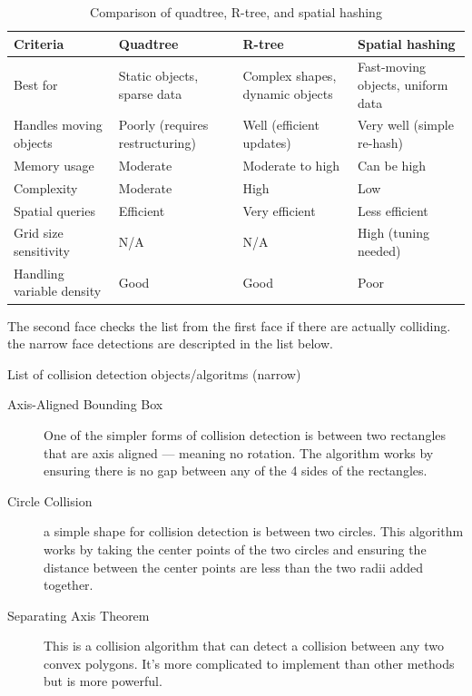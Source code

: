 \documentclass{projdoc}
\begin{document}
\begin{table}
	\begin{tabularx}{\linewidth}{p{8em}XXX}
		\toprule
		Criteria & Quadtree & R-tree & Spatial hashing \\
		\midrule
		Best for & Static objects, sparse data & Complex shapes, dynamic objects & Fast-moving objects, uniform data \\
		\midrule
		Handles moving objects & Poorly (requires restructuring) & Well (efficient updates) & Very well (simple re-hash) \\
		\midrule
		Memory usage & Moderate & Moderate to high & Can be high \\
		\midrule
		Complexity & Moderate & High & Low \\
		\midrule
		Spatial queries & Efficient & Very efficient & Less efficient \\
		\midrule
		Grid size sensitivity & N/A & N/A & High (tuning needed) \\
		\midrule
		Handling variable density & Good & Good & Poor \\
		\bottomrule
	\end{tabularx}
	\caption{Comparison of quadtree, R-tree, and spatial hashing}
\end{table}


The second face checks the list from the first face if there are actually colliding. the narrow face detections are descripted in the list below.

List of collision detection objects/algoritms (narrow)
\begin{description}
	\item[Axis-Aligned Bounding Box]One of the simpler forms of collision detection is
		between two rectangles that are axis aligned --- meaning no rotation. The
		algorithm works by ensuring there is no gap between any of the 4 sides of the
		rectangles.
	\item[Circle Collision] a simple shape for collision detection is between two
		circles. This algorithm works by taking the center points of the two circles and
		ensuring the distance between the center points are less than the two radii added
		together.
	\item[Separating Axis Theorem] This is a collision algorithm that can detect a
		collision between any two convex polygons. It's more complicated to implement
		than other methods but is more powerful.
\end{description}
\end{document}
